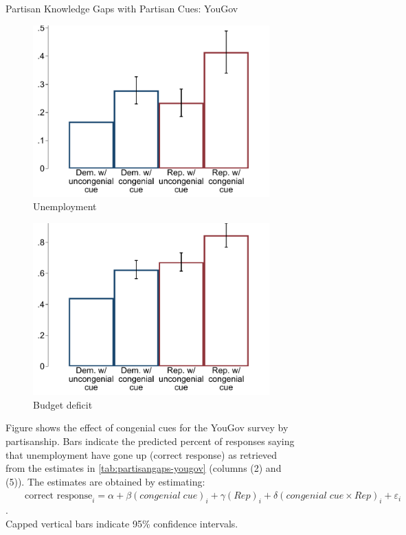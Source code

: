 \begin{figure}[ht]
	\caption{Partisan Knowledge Gaps with Partisan Cues: YouGov}
	\centering
	\begin{subfigure}{.495\textwidth}\centering
		\includegraphics[width=\textwidth]{../figs/yougov-unemp-congenialcue-partisan.pdf}
		\caption{Unemployment}
	\end{subfigure}
	\hfil
	\begin{subfigure}{.495\textwidth}\centering
		\includegraphics[width=\textwidth]{../figs/yougov-deficit-congenialcue-partisan.pdf}
		\caption{Budget deficit}
	\end{subfigure}
	\caption*{\footnotesize Figure shows the effect of congenial cues for the YouGov survey by partisanship. Bars indicate the predicted percent of responses saying that unemployment have gone up (correct response) as retrieved from the estimates in \cref{tab:partisangaps-yougov} (columns (2) and (5)).  The estimates are obtained by estimating:\\

	$\qquad\text{correct response}_{i} = \alpha + \beta (congenial \; cue)_i + \gamma (Rep)_i + \delta (congenial\; cue \times Rep)_i + \varepsilon_{i}$.\\

	Capped vertical bars indicate 95\% confidence intervals.
	}
	\label{fig:yougov-reg-by-partisanship}
\end{figure}

